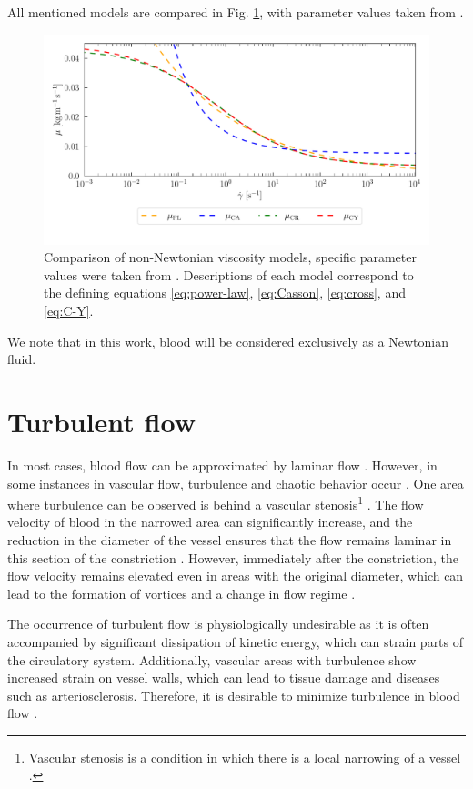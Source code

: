 All mentioned models are compared in Fig. \ref{fig:vs}, with parameter values taken from \cite{Eichler2023}.
\begin{figure}[H]
	\centering
	\includegraphics[width=1.0\textwidth]{figures/modely.pdf}
	\vspace{-9mm}
	\caption{Comparison of non-Newtonian viscosity models, specific parameter values were taken from \cite{Eichler2023}. Descriptions of each model correspond to the defining equations
		\eqref{eq:power-law}, \eqref{eq:Casson}, \eqref{eq:cross}, and \eqref{eq:C-Y}.}
	\label{fig:vs}
\end{figure}
We note that in this work, blood will be considered exclusively as a Newtonian fluid.

\section*{\fontsize{11}{15}\selectfont Turbulent flow}
In most cases, blood flow can be approximated by laminar flow \cite{Sequeira}. However, in some instances in vascular flow, turbulence and chaotic behavior occur \cite{Saqr2020}. One area where turbulence can be observed is behind a vascular stenosis\footnote{Vascular stenosis is a condition in which there is a local narrowing of a vessel \cite{Carabello2009}.} \cite{Jain2022}. The flow velocity of blood in the narrowed area can significantly increase, and the reduction in the diameter of the vessel ensures that the flow remains laminar in this section of the constriction \cite{Sequeira}. However, immediately after the constriction, the flow velocity remains elevated even in areas with the original diameter, which can lead to the formation of vortices and a change in flow regime \cite{Saloner2019, Varghese2003}.

The occurrence of turbulent flow is physiologically undesirable as it is often accompanied by significant dissipation of kinetic energy, which can strain parts of the circulatory system. Additionally, vascular areas with turbulence show increased strain on vessel walls, which can lead to tissue damage and diseases such as arteriosclerosis. Therefore, it is desirable to minimize turbulence in blood flow \cite{Saloner2019, Kameneva2004}.